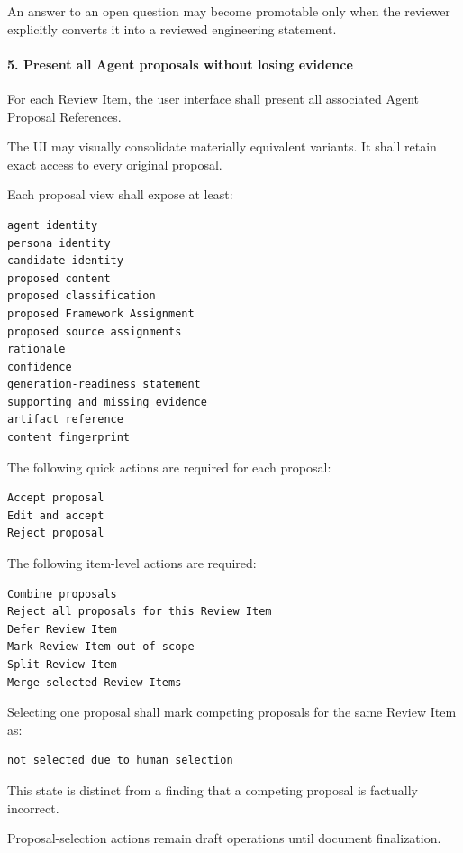 An answer to an open question may become promotable only when the reviewer explicitly converts it into a reviewed engineering statement.

\hypertarget{5-present-all-agent-proposals-without-losing-evidence}{%
\paragraph{5. Present all Agent proposals without losing evidence}\label{5-present-all-agent-proposals-without-losing-evidence}}

For each Review Item, the user interface shall present all associated Agent Proposal References.

The UI may visually consolidate materially equivalent variants. It shall retain exact access to every original proposal.

Each proposal view shall expose at least:

\begin{verbatim}
agent identity
persona identity
candidate identity
proposed content
proposed classification
proposed Framework Assignment
proposed source assignments
rationale
confidence
generation-readiness statement
supporting and missing evidence
artifact reference
content fingerprint
\end{verbatim}

The following quick actions are required for each proposal:

\begin{verbatim}
Accept proposal
Edit and accept
Reject proposal
\end{verbatim}

The following item-level actions are required:

\begin{verbatim}
Combine proposals
Reject all proposals for this Review Item
Defer Review Item
Mark Review Item out of scope
Split Review Item
Merge selected Review Items
\end{verbatim}

Selecting one proposal shall mark competing proposals for the same Review Item as:

\begin{verbatim}
not_selected_due_to_human_selection
\end{verbatim}

This state is distinct from a finding that a competing proposal is factually incorrect.

Proposal-selection actions remain draft operations until document finalization.

